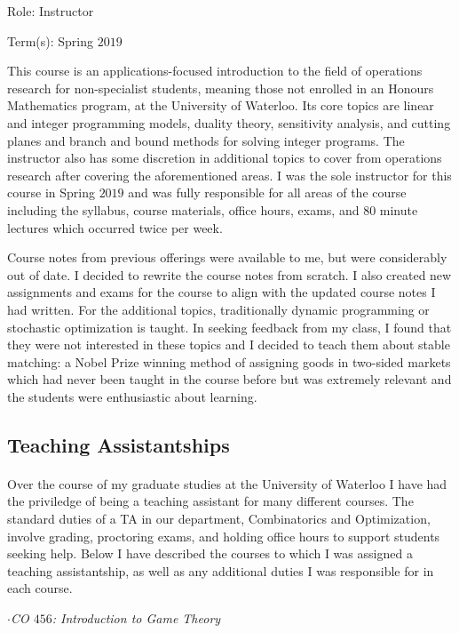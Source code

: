 \documentclass{article}
\begin{document}
 Role: Instructor
 
 Term(s): Spring $2019$

This course is an applications-focused introduction to the field of operations research for non-specialist students, meaning those not enrolled in an Honours Mathematics program, at the University of Waterloo. Its core topics are linear and integer programming models, duality theory, sensitivity analysis, and cutting planes and branch and bound methods for solving integer programs. The instructor also has some discretion in additional topics to cover from operations research after covering the aforementioned areas. I was the sole instructor for this course in Spring $2019$ and was fully responsible for all areas of the course including the syllabus, course materials, office hours, exams, and $80$ minute lectures which occurred twice per week. 

Course notes from previous offerings were available to me, but were considerably out of date. I decided to rewrite the course notes from scratch. I also created new assignments and exams for the course to align with the updated course notes I had written. For the additional topics, traditionally dynamic programming or stochastic optimization is taught. In seeking feedback from my class, I found that they were not interested in these topics and I decided to teach them about stable matching: a Nobel Prize winning method of assigning goods in two-sided markets which had never been taught in the course before but was extremely relevant and the students were enthusiastic about learning.

\subsection{Teaching Assistantships}
\paragraph{}Over the course of my graduate studies at the University of Waterloo I have had the priviledge of being a teaching assistant for many different courses. The standard duties of a TA in our department, Combinatorics and Optimization, involve grading, proctoring exams, and holding office hours to support students seeking help. Below I have described the courses to which I was assigned a teaching assistantship, as well as any additional duties I was responsible for in each course.
\bigskip

\noindent$\cdot$\emph{CO $456$: Introduction to Game Theory}
\end{document}
